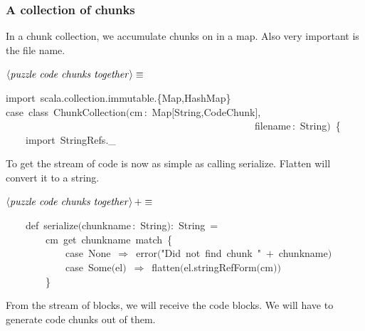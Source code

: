 \documentclass[a4paper,12pt]{article}
\begin{document}
\subsubsection{A collection of chunks}
In a chunk collection, we accumulate chunks on in a map. Also
very important is the file name.

$\left<\mbox{\emph{puzzle code chunks together}}\right>\equiv$
\begin{program}{\vem import}~scala.collection.immutable.{\small\{}Map,HashMap{\small\}}
\\{\vem case}~{\vem class}~ChunkCollection$($cm\,{\rm :}~Map$[$String,CodeChunk$]$,
\\~~~~~~~~~~~~~~~~~~~~~~~~~~~~~~~~~~~~~~~~~~~~~~~~~~filename\,{\rm :}~String$)$~{\small\{}
\\[0.5em]~~~~{\vem import}~StringRefs.\_
\\[0.5em]\end{program}



To get the stream of code is now as simple as calling
serialize. Flatten will convert it to a string.

$\left<\mbox{\emph{puzzle code chunks together}}\right>+\equiv$
\begin{program}~~~~{\vem def}~serialize$($chunkname\,{\rm :}~String$)${\rm :}~String~=
\\~~~~~~~~cm~get~chunkname~{\vem match}~{\small\{}
\\~~~~~~~~~~~~{\vem case}~None~$\Rightarrow$~error$($"Did~not~find~chunk~"~$+$~chunkname$)$
\\~~~~~~~~~~~~{\vem case}~Some$($el$)$~$\Rightarrow$~flatten$($el.stringRefForm$($cm$)$$)$
\\~~~~~~~~{\small\}}
\\[0.5em]\end{program}



From the stream of blocks, we will receive the code blocks. We
will have to generate code chunks out of them.
\end{document}
